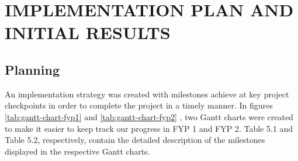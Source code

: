 \chapter{IMPLEMENTATION PLAN AND INITIAL RESULTS}
\section{Planning}

An implementation strategy was created with milestones achieve at key project
checkpoints in order to complete the project in a timely manner. In figures \ref{tab:gantt-chart-fyp1} and \ref{tab:gantt-chart-fyp2} , two Gantt charts were created to make it easier to keep
track our progress in FYP 1 and FYP 2.  Table 5.1 and Table 5.2, respectively, contain the detailed description of the milestones displayed in the respective Gantt charts.


